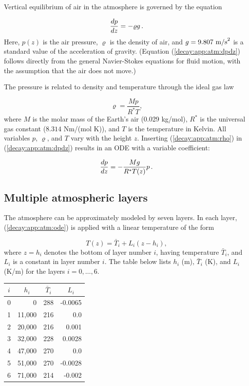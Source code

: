 \documentclass[%
oneside,                 %
final,                   %
10pt]{article}
\begin{document}
Vertical equilibrium of air in the atmosphere is governed by
the equation

\begin{equation}
\frac{dp}{dz} = -\varrho g
\tp
\label{decay:app:atm:dpdz}
\end{equation}
Here, $p(z)$ is the air pressure, $\varrho$ is the density of
air, and $g=9.807\hbox{ m/s}^2$ is a standard value of
the acceleration of gravity.
(Equation (\ref{decay:app:atm:dpdz}) follows directly from the general
Navier-Stokes equations for fluid motion, with
the assumption that the air does not move.)

The pressure is related to density and temperature through the ideal gas law

\begin{equation}
\varrho = \frac{Mp}{R^*T}, \label{decay:app:atm:rho}
\end{equation}
where $M$ is the molar mass of the Earth's air (0.029 kg/mol),
$R^*$ is the universal
gas constant ($8.314$ Nm/(mol K)), and $T$ is the temperature in Kelvin.
All variables $p$, $\varrho$, and $T$ vary with the height $z$.
Inserting (\ref{decay:app:atm:rho}) in (\ref{decay:app:atm:dpdz}) results
in an ODE with a variable coefficient:

\begin{equation}
\frac{dp}{dz} = -\frac{Mg}{R^*T(z)} p
\label{decay:app:atm:ode}
\thinspace  .
\end{equation}

\subsection{Multiple atmospheric layers}

The atmosphere can be approximately modeled by seven layers.
In each layer, (\ref{decay:app:atm:ode}) is applied with
a linear temperature of the form

\[ T(z) = \bar T_i + L_i(z-h_i),\]
where $z=h_i$ denotes the bottom of layer number $i$,
having temperature $\bar T_i$,
and $L_i$ is a constant in layer number $i$. The table below
lists $h_i$ (m), $\bar T_i$ (K), and $L_i$ (K/m) for the layers
$i=0,\ldots,6$.


\begin{center}
\begin{tabular}{lrrr}
\hline
\multicolumn{1}{c}{ $i$ } & \multicolumn{1}{c}{ $h_i$ } & \multicolumn{1}{c}{ $\bar T_i$ } & \multicolumn{1}{c}{ $L_i$ } \\
\hline
0   & 0      & 288        & -0.0065 \\
1   & 11,000 & 216        & 0.0     \\
2   & 20,000 & 216        & 0.001   \\
3   & 32,000 & 228        & 0.0028  \\
4   & 47,000 & 270        & 0.0     \\
5   & 51,000 & 270        & -0.0028 \\
6   & 71,000 & 214        & -0.002  \\
\hline
\end{tabular}
\end{center}
\end{document}
